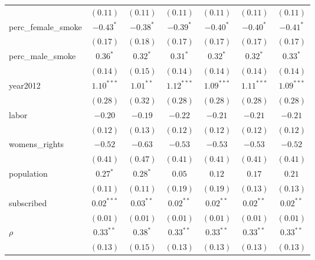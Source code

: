 \begin{table}[!h]
\begin{center}
\begin{tabular}{l c c c c c c }
                        & $(0.11)$     & $(0.11)$    & $(0.11)$     & $(0.11)$     & $(0.11)$     & $(0.11)$     \\
perc\_female\_smoke     & $-0.43^{*}$  & $-0.38^{*}$ & $-0.39^{*}$  & $-0.40^{*}$  & $-0.40^{*}$  & $-0.41^{*}$  \\
                        & $(0.17)$     & $(0.18)$    & $(0.17)$     & $(0.17)$     & $(0.17)$     & $(0.17)$     \\
perc\_male\_smoke       & $0.36^{*}$   & $0.32^{*}$  & $0.31^{*}$   & $0.32^{*}$   & $0.32^{*}$   & $0.33^{*}$   \\
                        & $(0.14)$     & $(0.15)$    & $(0.14)$     & $(0.14)$     & $(0.14)$     & $(0.14)$     \\
year2012                & $1.10^{***}$ & $1.01^{**}$ & $1.12^{***}$ & $1.09^{***}$ & $1.11^{***}$ & $1.09^{***}$ \\
                        & $(0.28)$     & $(0.32)$    & $(0.28)$     & $(0.28)$     & $(0.28)$     & $(0.28)$     \\
labor                   & $-0.20$      & $-0.19$     & $-0.22$      & $-0.21$      & $-0.21$      & $-0.21$      \\
                        & $(0.12)$     & $(0.13)$    & $(0.12)$     & $(0.12)$     & $(0.12)$     & $(0.12)$     \\
womens\_rights          & $-0.52$      & $-0.63$     & $-0.53$      & $-0.53$      & $-0.53$      & $-0.52$      \\
                        & $(0.41)$     & $(0.47)$    & $(0.41)$     & $(0.41)$     & $(0.41)$     & $(0.41)$     \\
population              & $0.27^{*}$   & $0.28^{*}$  & $0.05$       & $0.12$       & $0.17$       & $0.21$       \\
                        & $(0.11)$     & $(0.11)$    & $(0.19)$     & $(0.19)$     & $(0.13)$     & $(0.13)$     \\
subscribed              & $0.02^{***}$ & $0.03^{**}$ & $0.02^{**}$  & $0.02^{**}$  & $0.02^{**}$  & $0.02^{**}$  \\
                        & $(0.01)$     & $(0.01)$    & $(0.01)$     & $(0.01)$     & $(0.01)$     & $(0.01)$     \\
$\rho$                  & $0.33^{**}$  & $0.38^{*}$  & $0.33^{**}$  & $0.33^{**}$  & $0.33^{**}$  & $0.33^{**}$  \\
                        & $(0.13)$     & $(0.15)$    & $(0.13)$     & $(0.13)$     & $(0.13)$     & $(0.13)$     \\

\end{tabular}
\end{center}
\end{table}
